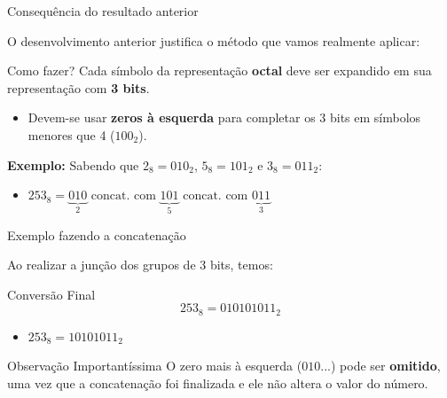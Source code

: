 \begin{frame}{Consequência do resultado anterior}


    O desenvolvimento anterior justifica o método que vamos realmente aplicar:

    \begin{block}{Como fazer?}
        Cada símbolo da representação \textbf{octal} deve ser expandido em sua representação com \textbf{3 bits}.
    \end{block}

    \begin{itemize}
        \item Devem-se usar \textbf{zeros à esquerda} para completar os 3 bits em símbolos menores que 4 ($100_2$).
    \end{itemize}

    \vspace{0.3cm}
    \textbf{Exemplo:} Sabendo que $2_8 = 010_2$, $5_8 = 101_2$ e $3_8 = 011_2$:

    \begin{itemize}
        \item $253_8 = \underbrace{010}_{2} \text{ concat. com } \underbrace{101}_{5} \text{ concat. com } \underbrace{011}_{3}$
    \end{itemize}
\end{frame}

\begin{frame}{Exemplo fazendo a concatenação}


    Ao realizar a junção dos grupos de 3 bits, temos:

    \begin{exampleblock}{Conversão Final}
        $$253_8 = 010101011_2$$
    \end{exampleblock}

    \vspace{0.5cm}
    \begin{itemize}
        \item $253_8 = 10101011_2$
    \end{itemize}

    \begin{alertblock}{Observação Importantíssima}
        O zero mais à esquerda ($010...$) pode ser \textbf{omitido}, uma vez que a concatenação foi finalizada e ele não altera o valor do número.
    \end{alertblock}
\end{frame}



